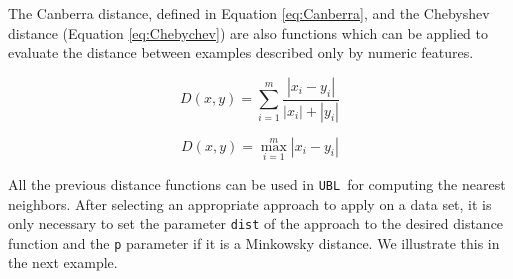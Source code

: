 \documentclass[10pt,a4paper]{article}\usepackage[]{graphicx}\usepackage[]{color}
\newcommand{\UBL}{\texttt{UBL}\ }
\begin{document}
The Canberra distance, defined in Equation \ref{eq:Canberra}, and the Chebyshev distance (Equation \ref{eq:Chebychev}) are also functions which can be applied to evaluate the distance between examples described only by numeric features.



\begin{equation}\label{eq:Canberra}
D(x,y)= \sum_{i=1}^{m}\frac{|x_i-y_i|}{|x_i|+|y_i|}
\end{equation}

\begin{equation}\label{eq:Chebychev}
D(x,y)=\max_{i=1}^{m}|x_i-y_i|
\end{equation}

All the previous distance functions can be used in \UBL for computing the nearest neighbors. After selecting an appropriate approach to apply on a data set, it is only necessary to set the parameter \texttt{dist} of the approach to the desired distance function and the \texttt{p} parameter if it is a Minkowsky distance. We illustrate this in the next example.
\end{document}
